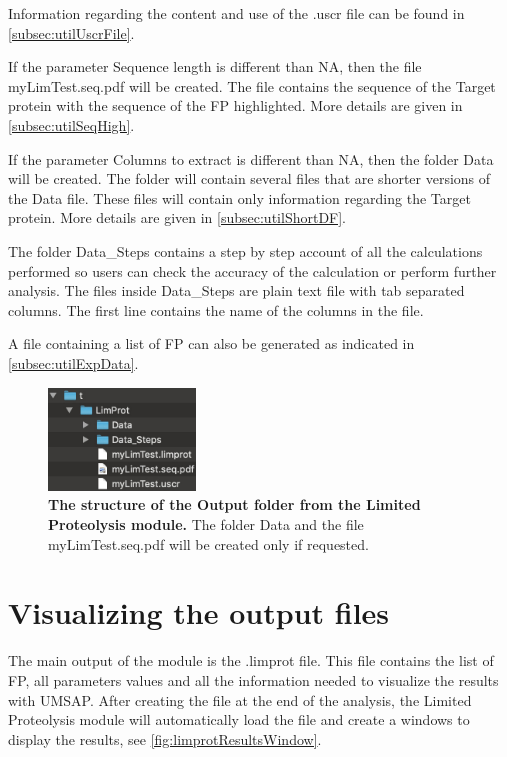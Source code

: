 Information regarding the content and use of the .uscr file can be found in \autoref{subsec:utilUscrFile}.

If the parameter Sequence length is different than NA, then the file myLimTest.seq.pdf will be created. The file contains the sequence of the Target protein with the sequence of the FP highlighted. More details are given in \autoref{subsec:utilSeqHigh}.

If the parameter Columns to extract is different than NA, then the folder Data will be created. The folder will contain several files that are shorter versions of the Data file. These files will contain only information regarding the Target protein. More details are given in \autoref{subsec:utilShortDF}.

The folder Data\_Steps contains a step by step account of all the calculations performed so users can check the accuracy of the calculation or perform further analysis. The files inside Data\_Steps are plain text file with tab separated columns. The first line contains the name of the columns in the file.

A file containing a list of FP can also be generated as indicated in \autoref{subsec:utilExpData}.

\begin{figure}[h]
	\centering
	\includegraphics[width=0.35\textwidth]{./IMAGES/MOD-LIMPROT/limprot-files.jpg}	    
	\caption[The structure of the Output folder from the Limited Proteolysis module]{\textbf{The structure of the Output folder from the Limited Proteolysis module.} The folder Data and the file myLimTest.seq.pdf will be created only if requested.} 
	\label{fig:limprotOutFolder}
	\vspace{-5pt} 	
\end{figure}

\section{Visualizing the output files}

The main output of the module is the .limprot file. This file contains the list of FP,  all parameters values and all the information needed to visualize the results with UMSAP. After creating the file at the end of the analysis, the Limited Proteolysis module will automatically load the file and create a windows to display the results, see \autoref{fig:limprotResultsWindow}.


